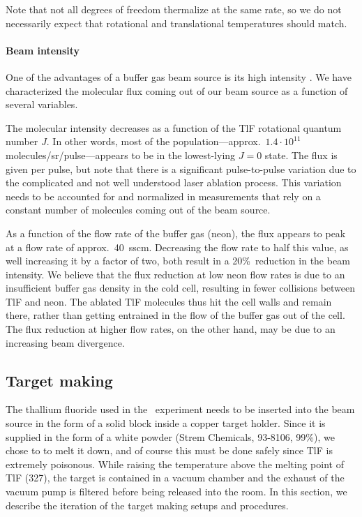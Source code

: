 Note that not all degrees of freedom thermalize at the same rate, so we do not
necessarily expect that rotational and translational temperatures should match.

\paragraph{Beam intensity}

One of the advantages of a buffer gas beam source is its high intensity
\cite{hutzler2012buffer}. We have characterized the molecular flux coming out of
our beam source as a function of several variables.

The molecular intensity decreases as a function of the TlF rotational quantum
number $J$. In other words, most of the population---approx.\ $1.4\cdot10^{11}$
molecules/sr/pulse---appears to be in the lowest-lying $J=0$ state.
\cite[Fig.~5.8]{timgren2023thesis} The flux is given per pulse, but note that
there is a significant pulse-to-pulse variation due to the complicated and not
well understood laser ablation process. This variation needs to be accounted for
and normalized in measurements that rely on a constant number of molecules
coming out of the beam source.

As a function of the flow rate of the buffer gas (neon), the flux appears to
peak at a flow rate of approx.\ 40~sscm. Decreasing the flow rate to half this
value, as well increasing it by a factor of two, both result in a 20\%\
reduction in the beam intensity. \cite[Fig.~5.4]{timgren2023thesis} We believe
that the flux reduction at low neon flow rates is due to an insufficient buffer
gas density in the cold cell, resulting in fewer collisions between TlF and
neon. The ablated TlF molecules thus hit the cell walls and remain there, rather
than getting entrained in the flow of the buffer gas out of the cell. The flux
reduction at higher flow rates, on the other hand, may be due to an increasing
beam divergence. \cite[sect~5.2]{timgren2023thesis}

\subsection{Target making}
\label{target_making}

The thallium fluoride used in the \CENTREX\ experiment needs to be inserted into
the beam source in the form of a solid block inside a copper target holder.
Since it is supplied in the form of a white powder (Strem Chemicals, 93-8106,
99\%), we chose to to melt it down, and of course this must be done safely since
TlF is extremely poisonous. While raising the temperature above the melting
point of TlF (327\degC), the target is contained in a vacuum chamber and the
exhaust of the vacuum pump is filtered before being released into the room. In
this section, we describe the iteration of the target making setups and
procedures.

